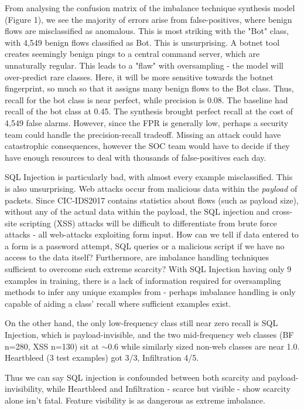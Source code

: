 \documentclass{article}
\begin{document}
\par From analysing the confusion matrix of the imbalance technique synthesis model (Figure 1), we see the majority of errors arise from false-positives, where benign flows are misclassified as anomalous. This is most striking with the "Bot" class, with 4,549 benign flows classified as Bot. This is unsurprising. A botnet tool creates seemingly benign pings to a central command server, which are unnaturally regular. This leads to a "flaw" with oversampling - the model will over-predict rare classes. Here, it will be more sensitive towards the botnet fingerprint, so much so that it assigns many benign flows to the Bot class. Thus, recall for the bot class is near perfect, while precision is 0.08. The baseline had recall of the bot class at 0.45. The synthesis brought perfect recall at the cost of 4,549 false alarms. However, since the FPR is generally low, perhaps a security team could handle the precision-recall tradeoff. Missing an attack could have catastrophic consequences, however the SOC team would have to decide if they have enough resources to deal with thousands of false-positives each day.
\par SQL Injection is particularly bad, with almost every example misclassified. This is also unsurprising. Web attacks occur from malicious data within the \textit{payload} of packets. Since CIC-IDS2017 contains statistics about flows (such as payload size), without any of the actual data within the payload, the SQL injection and cross-site scripting (XSS) attacks will be difficult to differentiate from  brute force attacks - all web-attacks exploiting form input. How can we tell if data entered to a form is a password attempt, SQL queries or a malicious script if we have no access to the data itself? Furthermore, are imbalance handling techniques sufficient to overcome such extreme scarcity? With SQL Injection having only 9 examples in training, there is a lack of information required for oversampling methods to infer any unique examples from - perhaps imbalance handling is only capable of aiding a class' recall where sufficient examples exist.
\par On the other hand, the only low-frequency class still near zero recall is SQL Injection, which is payload-invisible, and the two mid-frequency web classes (BF n=280, XSS n=130) sit at $\sim$0.6 while similarly sized non-web classes are near 1.0. Heartbleed (3 test examples) got 3/3, Infiltration 4/5. 
\par Thus we can say SQL injection is confounded between both scarcity and payload-invisibility, while Heartbleed and Infiltration - scarce but visible - show scarcity alone isn't fatal. Feature visibility is as dangerous as extreme imbalance.
\end{document}
